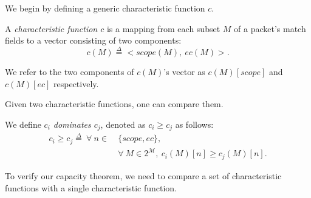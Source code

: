 We begin by defining a generic characteristic function $c$.
\begin{definition} A {\em characteristic function $c$} is a mapping from each subset $M$ of a packet's match fields to a vector consisting of two components: 
\begin{equation*}
c(M) \overset{\Delta}{=} <scope(M),\ ec(M)>.
\end{equation*}
\end{definition}

We refer to the two components of $c(M)$'s vector as $c(M)[scope]$ and $c(M)[ec]$ respectively.






Given two characteristic functions, one can compare them. 

\begin{definition}We define {\em $c_i$ dominates $c_j$}, denoted as $c_i \geq c_j$ as follows:
\begin{equation*}
\begin{split}
c_i \geq c_j \overset{\Delta}{=}\ \forall\ n \in\ &\{scope, ec\},\\
&\forall\ M \in 2^\mathcal{M},\ c_i(M)[n] \geq c_j(M)[n].
\end{split}
\end{equation*}
\end{definition}

To verify our capacity theorem, we need to compare a set of characteristic functions with a single characteristic function.

